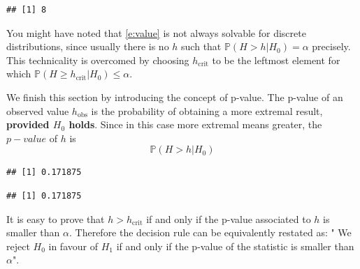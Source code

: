 \begin{knitrout}
\begin{kframe}
{\ttfamily\noindent\bfseries{}}\begin{alltt}
\hldef{(}\hlopt{-}    \hldef{=} \hlopt{/} \hldef{)}
\end{alltt}
\begin{verbatim}
## [1] 8
\end{verbatim}
\end{kframe}
\end{knitrout}
You might have noted that \eqref{e:value} is not always solvable for discrete distributions, since usually there is no $h$ such that $\mathbb P(H > h |H_0) = \alpha$ precisely. This technicality is overcomed by choosing $h_{\text{crit}}$ to be the leftmost element for which $\mathbb P( H \geq h_{\text{crit}} | H_0) \leq\alpha$. 

	We finish this section by introducing the concept of p-value. The p-value of an observed value $h_\text{obs}$ is the probability of obtaining a more extremal result, \textbf{provided $H_0$ holds}. Since in this case more extremal means greater, the $p-value$ of $h$ is 
	\begin{equation}
		\label{e:p-value}
		\mathbb P( H > h | H_0)
	\end{equation}
\begin{knitrout}
\color{fgcolor}\begin{kframe}
\begin{alltt}
 \hlkwb{<-} 
\hldef{(} \hlopt{:}    \hldef{=} \hlopt{/}\hldef{))}
\end{alltt}
\begin{verbatim}
## [1] 0.171875
\end{verbatim}
\begin{alltt}
\hlopt{-}  \hlopt{-} \hldef{,}    \hldef{=} \hlopt{/}\hldef{)}
\end{alltt}
\begin{verbatim}
## [1] 0.171875
\end{verbatim}
\end{kframe}
\end{knitrout}
	It is easy to prove that $h > h_{\text{crit}}$ if and only if the p-value associated to $h$ is smaller than $\alpha$. Therefore the decision rule can be equivalently restated as: " We reject $H_0$ in favour of $H_1$ if and only if the p-value of the statistic is smaller than $\alpha$".  
	
